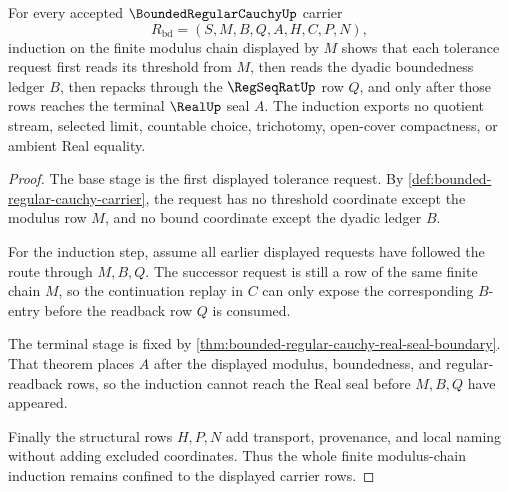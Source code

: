 \begin{theorem}
\label{thm:bounded-regular-cauchy-modulus-chain-induction}
For every accepted $\BoundedRegularCauchyUp$ carrier
$$
R_{\mathrm{bd}}=(S,M,B,Q,A,H,C,P,N),
$$
induction on the finite modulus chain displayed by $M$ shows that each tolerance request first reads its threshold from $M$, then reads the dyadic boundedness ledger $B$, then repacks through the $\RegSeqRatUp$ row $Q$, and only after those rows reaches the terminal $\RealUp$ seal $A$. The induction exports no quotient stream, selected limit, countable choice, trichotomy, open-cover compactness, or ambient Real equality.
\end{theorem}
\begin{proof}
The base stage is the first displayed tolerance request. By \autoref{def:bounded-regular-cauchy-carrier}, the request has no threshold coordinate except the modulus row $M$, and no bound coordinate except the dyadic ledger $B$.

For the induction step, assume all earlier displayed requests have followed the route through $M,B,Q$. The successor request is still a row of the same finite chain $M$, so the continuation replay in $C$ can only expose the corresponding $B$-entry before the readback row $Q$ is consumed.

The terminal stage is fixed by \autoref{thm:bounded-regular-cauchy-real-seal-boundary}. That theorem places $A$ after the displayed modulus, boundedness, and regular-readback rows, so the induction cannot reach the Real seal before $M,B,Q$ have appeared.

Finally the structural rows $H,P,N$ add transport, provenance, and local naming without adding excluded coordinates. Thus the whole finite modulus-chain induction remains confined to the displayed carrier rows.
\end{proof}

